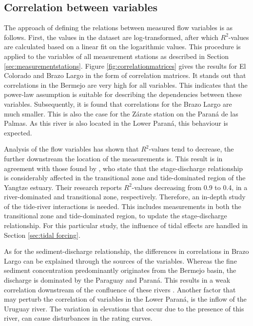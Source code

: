 \subsection{Correlation between variables}
\label{sec:correlation of variables}
The approach of defining the relations between measured flow variables is as follows. First, the values in the dataset are log-transformed, after which $R^2$-values are calculated based on a linear fit on the logarithmic values. This procedure is applied to the variables of all measurement stations as described in Section \ref{sec:measurementstations}. Figure \ref{fig:correlationmatrices} gives the results for El Colorado and Brazo Largo in the form of correlation matrices. It stands out that correlations in the Bermejo are very high for all variables. This indicates that the power-law assumption is suitable for describing the dependencies between these variables. Subsequently, it is found that correlations for the Brazo Largo are much smaller. This is also the case for the Zárate station on the Paraná de las Palmas. As this river is also located in the Lower Paraná, this behaviour is expected. 

Analysis of the flow variables has shown that $R^2$-values tend to decrease, the further downstream the location of the measurements is. This result is in agreement with those found by \citeauthor{songEvaluatingUnderstandingTideriver2024}, who state that the stage-discharge relationship is considerably affected in the transitional zone and tide-dominated region of the Yangtze estuary. Their research reports $R^2$-values decreasing from 0.9 to 0.4, in a river-dominated and transitional zone, respectively. Therefore, an in-depth study of the tide-river interactions is needed. This includes measurements in both the transitional zone and tide-dominated region, to update the stage-discharge relationship. For this particular study, the influence of tidal effects are handled in Section \ref{sec:tidal forcing}.

As for the sediment-discharge relationship, the differences in correlations in Brazo Largo can be explained through the sources of the variables. Whereas the fine sediment concentration predominantly originates from the Bermejo basin, the discharge is dominated by the Paraguay and Paraná. This results in a weak correlation downstream of the confluence of these rivers \autocite{lopezweibelSourcesTemporalDynamics2022}. Another factor that may perturb the correlation of variables in the Lower Paraná, is the inflow of the Uruguay river. The variation in elevations that occur due to the presence of this river, can cause disturbances in the rating curves. 



